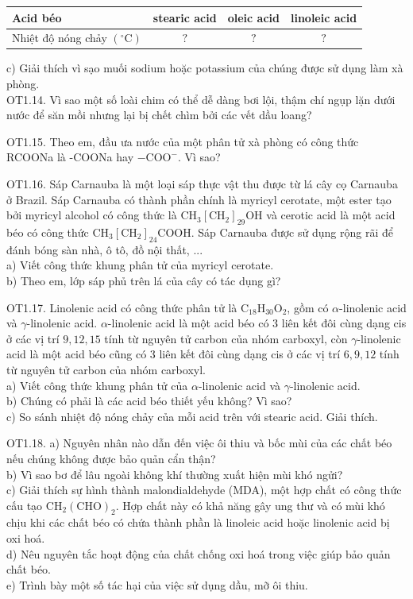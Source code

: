 \documentclass[10pt]{article}
\begin{document}
\begin{center}
\begin{tabular}{|l|c|c|c|}
\hline
Acid béo & stearic acid & oleic acid & linoleic acid \\
\hline
Nhiệt độ nóng chảy $\left({ }^{\circ} \mathrm{C}\right)$ & $?$ & $?$ & $?$ \\
\hline
\end{tabular}
\end{center}

c) Giải thích vì sạo muối sodium hoặc potassium của chúng được sử dụng làm xà phòng.\\
OT1.14. Vì sao một số loài chim có thể dễ dàng bơi lội, thậm chí ngụp lặn dưới nước để săn mồi nhưng lại bị chết chìm bởi các vết dầu loang?

OT1.15. Theo em, đầu ưa nước của một phân tử xà phòng có công thức RCOONa là -COONa hay $-\mathrm{COO}^{-}$. Vì sao?

OT1.16. Sáp Carnauba là một loại sáp thực vật thu được từ lá cây cọ Carnauba ở Brazil. Sáp Carnauba có thành phần chính là myricyl cerotate, một ester tạo bởi myricyl alcohol có công thức là $\mathrm{CH}_{3}\left[\mathrm{CH}_{2}\right]_{29} \mathrm{OH}$ và cerotic acid là một acid béo có công thức $\mathrm{CH}_{3}\left[\mathrm{CH}_{2}\right]_{24} \mathrm{COOH}$. Sáp Carnauba được sử dụng rộng rãi để đánh bóng sàn nhà, ô tô, đồ nội thất, ...\\
a) Viết công thức khung phân tử của myricyl cerotate.\\
b) Theo em, lớp sáp phủ trên lá của cây có tác dụng gì?

OT1.17. Linolenic acid có công thức phân tử là $\mathrm{C}_{18} \mathrm{H}_{30} \mathrm{O}_{2}$, gồm có $\alpha$-linolenic acid và $\gamma$-linolenic acid. $\alpha$-linolenic acid là một acid béo có 3 liên kết đôi cùng dạng cis ở các vị trí $9,12,15$ tính từ nguyên tử carbon của nhóm carboxyl, còn $\gamma$-linolenic acid là một acid béo cũng có 3 liên kết đôi cùng dạng cis ở các vị trí $6,9,12$ tính từ nguyên tử carbon của nhóm carboxyl.\\
a) Viết công thức khung phân tử của $\alpha$-linolenic acid và $\gamma$-linolenic acid.\\
b) Chúng có phải là các acid béo thiết yếu không? Vì sao?\\
c) So sánh nhiệt độ nóng chảy của mỗi acid trên với stearic acid. Giải thích.

OT1.18. a) Nguyên nhân nào dẫn đến việc ôi thiu và bốc mùi của các chất béo nếu chúng không được bảo quản cẩn thận?\\
b) Vì sao bơ để lâu ngoài không khí thường xuất hiện mùi khó ngửi?\\
c) Giải thích sự hình thành malondialdehyde (MDA), một hợp chất có công thức cấu tạo $\mathrm{CH}_{2}(\mathrm{CHO})_{2}$. Hợp chất này có khả năng gây ung thư và có mùi khó chịu khi các chất béo có chứa thành phần là linoleic acid hoặc linolenic acid bị oxi hoá.\\
d) Nêu nguyên tắc hoạt động của chất chống oxi hoá trong việc giúp bảo quản chất béo.\\
e) Trình bày một số tác hại của việc sử dụng dầu, mỡ ôi thiu.
\end{document}
